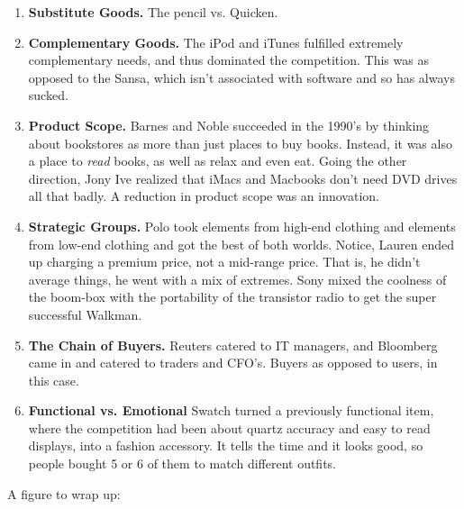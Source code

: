 \documentclass[11pt, oneside]{article}   	%
\begin{document}
\begin{enumerate}
\item \textbf{Substitute Goods.}  The pencil vs. Quicken.
\item \textbf{Complementary Goods.}  The iPod and iTunes fulfilled extremely complementary needs, and thus dominated the competition.  This was as opposed to the Sansa, which isn't associated with software and so has always sucked.
\item \textbf{Product Scope.}  Barnes and Noble succeeded in the 1990's by thinking about bookstores as more than just places to buy books.  Instead, it was also a place to \textit{read} books, as well as relax and even eat.  Going the other direction, Jony Ive realized that iMacs and Macbooks don't need DVD drives all that badly.  A reduction in product scope was an innovation.
\item \textbf{Strategic Groups.}  Polo took elements from high-end clothing and elements from low-end clothing and got the best of both worlds.  Notice, Lauren ended up charging a premium price, not a mid-range price.  That is, he didn't average things, he went with a mix of extremes.  Sony mixed the coolness of the boom-box with the portability of the transistor radio to get the super successful Walkman.
\item  \textbf{The Chain of Buyers.}  Reuters catered to IT managers, and Bloomberg came in and catered to traders and CFO's.  Buyers as opposed to users, in this case.  
\item   \textbf{Functional vs. Emotional}  Swatch turned a previously functional item, where the competition had been about quartz accuracy and easy to read displays, into a fashion accessory.  It tells the time and it looks good, so people bought 5 or 6 of them to match different outfits.  
\end{enumerate}

A figure to wrap up:
\end{document}
